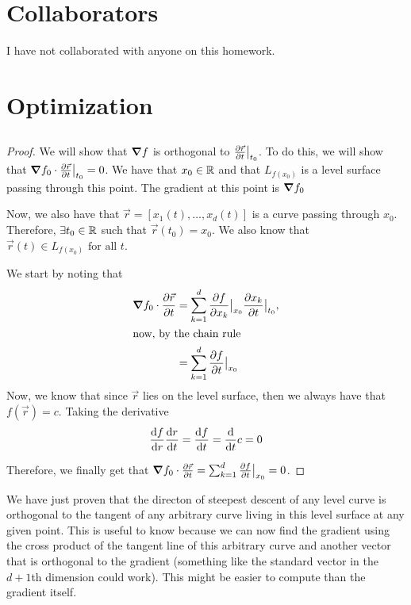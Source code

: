 \documentclass{article}
\begin{document}
\section{Collaborators}
I have not collaborated with anyone on this homework.

\section{Optimization}
\subsection{}
\begin{proof}
    We will show that $\grad f $ is orthogonal to $\pdv{\vec{r}}{t}\big|_{t_0}$. To do this, we will show that $\grad f_{0} \cdot \pdv{\vec{r}}{t}\big|_{t_{0}} = 0$.
    We have that $x_{0} \in \mathbb{R}$ and that $L_{f(x_{0})}$ is a level surface passing through this point. The gradient at this point is 
    $\grad f_{0}$

    Now, we also have that $\vec{r} = [x_{1}(t), \dots, x_{d}(t)]$ is a curve passing through $x_{0}$. Therefore, $\exists t_{0} \in \mathbb{R}$
    such that $\vec{r}(t_{0}) = x_{0}$. We also know that $\vec{r}(t) \in L_{f(x_{0})} \text{ for all } t$.

    We start by noting that
    \begin{align*}
        \grad f_{0} \cdot \pdv{\vec{r}}{t} &= \sum_{k=1}^{d}\pdv{f}{x_{k}}\big |_{x_{0}}\pdv{x_{k}}{t}\big |_{t_{0}},\\
                                           \intertext{now, by the chain rule}
                                           &= \sum_{k=1}^{d} \pdv{f}{t} \big |_{x_{0}}
    \end{align*}
    Now, we know that since $\vec{r}$ lies on the level surface, then we always have that $f(\vec{r}) = c$. Taking the derivative
    \begin{equation*}
        \dv{f}{r}\dv{r}{t} = \dv{f}{t} = \dv{}{t}c = 0
    \end{equation*}

    Therefore, we finally get that $\grad f_{0} \cdot \pdv{\vec{r}}{t} = \sum_{k=1}^{d} \pdv{f}{t} \big |_{x_{0}} = 0$.
\end{proof}

We have just proven that the directon of steepest descent of any level curve is orthogonal to the tangent of any arbitrary curve living
in this level surface at any given point. This is useful to know because we can now find the gradient using the cross product of the
tangent line of this arbitrary curve and another vector that is orthogonal to the gradient (something like the standard vector in the 
$d+1$th dimension could work). This might be easier to compute than the gradient itself.
\end{document}
